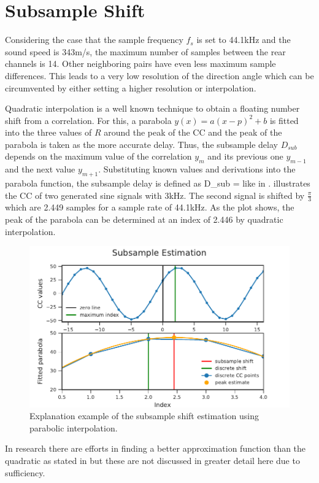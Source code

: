 \section{Subsample Shift}
\label{sec:02_subsampleShift}

Considering the case that the sample frequency $f_s$ is set to 44.1\si{\kilo\hertz}
and the sound speed is 343\si{m/s}, the maximum number of samples
between the rear channels is 14.
Other neighboring pairs have even less maximum sample differences.
This leads to a very low resolution of the direction angle which can be
circumvented by either setting a higher resolution or interpolation.

Quadratic interpolation is a well known technique to obtain a floating number
shift from a correlation.
For this, a parabola $y(x) = a(x-p)^2+b$ is fitted into the three values of $R$ around the peak
of the \ac{CC} and the peak of the parabola is taken as the more accurate
delay.
Thus, the subsample delay $D_{sub}$ depends on the maximum value of the correlation $y_m$
and its previous one $y_{m-1}$ and the next value $y_{m+1}$.
Substituting known values and derivations into the parabola function,
the subsample delay is defined as
\bal
	D_{sub} = 
	\label{eq:02_subsample}
\eal
like in \cite{C_H_subsampleDelay}.
 illustrates the \ac{CC} of two generated sine signals with 3\si{\kilo\hertz}.
The second signal is shifted by $\frac{\pi}{3}$ which are 2.449 samples for a sample rate
of 44.1kHz.
As the plot shows, the peak of the parabola can be determined at an index of 2.446 by
quadratic interpolation.
\begin{figure}[ht]
	\centering
		\includegraphics[]{figures/subsample_shift}
	\caption{Explanation example of the subsample shift estimation using parabolic interpolation.}
    \label{fig:02_subsampleShift}
\end{figure}
In research there are efforts in finding a better approximation function than the quadratic as stated
in \cite{S_L_subsampleInterpolation} but these are not discussed in greater detail here
due to sufficiency.
